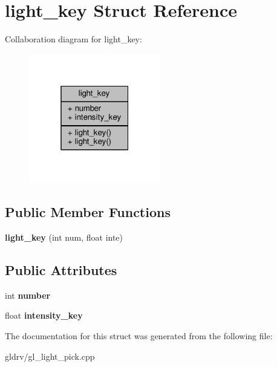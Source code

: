 \hypertarget{structlight__key}{}\section{light\+\_\+key Struct Reference}
\label{structlight__key}


Collaboration diagram for light\+\_\+key\+:
\nopagebreak
\begin{figure}[H]
\begin{center}
\leavevmode
\includegraphics[width=163pt]{dd/dba/structlight__key__coll__graph}
\end{center}
\end{figure}
\subsection*{Public Member Functions}
\begin{DoxyCompactItemize}
\item 
{\bfseries light\+\_\+key} (int num, float inte)\hypertarget{structlight__key_a851a90164a79d2ace96ea15d2c3537b7}{}\label{structlight__key_a851a90164a79d2ace96ea15d2c3537b7}

\end{DoxyCompactItemize}
\subsection*{Public Attributes}
\begin{DoxyCompactItemize}
\item 
int {\bfseries number}\hypertarget{structlight__key_a4f37fde215d5e689ccd6c95d645fd6dc}{}\label{structlight__key_a4f37fde215d5e689ccd6c95d645fd6dc}

\item 
float {\bfseries intensity\+\_\+key}\hypertarget{structlight__key_aa548f3a9203b74860950e438cdfaa8a3}{}\label{structlight__key_aa548f3a9203b74860950e438cdfaa8a3}

\end{DoxyCompactItemize}


The documentation for this struct was generated from the following file\+:\begin{DoxyCompactItemize}
\item 
gldrv/gl\+\_\+light\+\_\+pick.\+cpp\end{DoxyCompactItemize}
